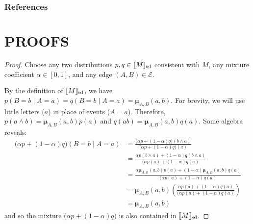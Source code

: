 \documentclass{article}
\DeclarePairedDelimiter{\SD}{\llbracket}{\rrbracket_{\text{sd}}}
\newcommand{\bmu}{\boldsymbol{\mu}}
\newcommand{\Ed}{\mathcal E}
\numberwithin{equation}{section}
\begin{document}
	\subsubsection*{References}
	\printbibliography[heading=none]
	
	\onecolumn
	\appendix
	
	\section{PROOFS}
	\thmsetconvex*
	\begin{proof}
		Choose any two distributions $p, q \in \SD{M}$ consistent with $M$, any mixture coefficient $\alpha \in [0,1]$, and any edge $(A,B) \in \Ed$.
		
		By the definition of $\SD{M}$, we have $p(B = b \mid A = a) = q(B = b \mid A = a) = \bmu_{A,B}(a,b)$.  
		For brevity, we will use little letters ($a$) in place of events ($A = a$).
		Therefore, $p(a\land b) = \bmu_{A,B}(a,b) p(a)$ and $q(ab) = \bmu_{A,B}(a,b) q(a)$. Some algebra reveals:
		\begin{align*}
			\Big( \alpha p + (1-\alpha) q \Big) (B = b \mid A = a) &= 
			\frac{\Big( \alpha p + (1-\alpha) q \Big) (b \land a)}{\Big( \alpha p + (1-\alpha) q \Big) (a)} \\
			&= \frac{ \alpha p(b \land a) + (1-\alpha) q(b \land a) }{\Big( \alpha p(a) + (1-\alpha) q (a)} \\
			&= \frac{ \alpha \bmu_{A,B}(a,b) p(a) + (1-\alpha) \bmu_{A,B}(a,b) q(a) }{\Big( \alpha p(a) + (1-\alpha) q (a)} \\
			&=\bmu_{A,B}(a,b) \left(\frac{ \alpha  p(a) + (1-\alpha) q(a) }{\Big( \alpha p(a) + (1-\alpha) q (a)}\right)\\
			&= \bmu_{A,B}(a,b)
		\end{align*}
		and so the mixture $\Big(\alpha p + (1-\alpha) q \Big)$ is also contained in $\SD{M}$.
	\end{proof}
	
\end{document}

